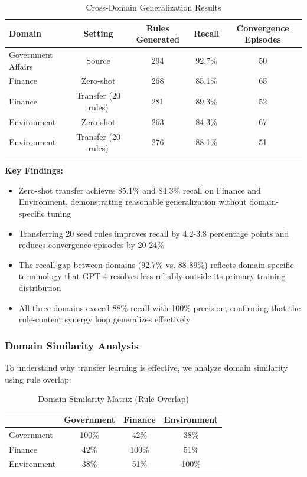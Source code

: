 \documentclass[runningheads]{llncs}
\begin{document}
\begin{table}[H]
    \centering
    \caption{Cross-Domain Generalization Results}
    \label{tab:cross_domain}
    \begin{tabular}{l c c c c}
    \toprule
    Domain & Setting & Rules Generated & Recall & Convergence Episodes \\
    \midrule
    Government Affairs & Source & 294 & 92.7\% & 50 \\
    \midrule
    Finance & Zero-shot & 268 & 85.1\% & 65 \\
    Finance & Transfer (20 rules) & 281 & 89.3\% & 52 \\
    \midrule
    Environment & Zero-shot & 263 & 84.3\% & 67 \\
    Environment & Transfer (20 rules) & 276 & 88.1\% & 51 \\
    \bottomrule
    \end{tabular}
\end{table}

\textbf{Key Findings:}
\begin{itemize}
    \item Zero-shot transfer achieves 85.1\% and 84.3\% recall on Finance and Environment, demonstrating reasonable generalization without domain-specific tuning
    \item Transferring 20 seed rules improves recall by 4.2-3.8 percentage points and reduces convergence episodes by 20-24\%
    \item The recall gap between domains (92.7\% vs. 88-89\%) reflects domain-specific terminology that GPT-4 resolves less reliably outside its primary training distribution
    \item All three domains exceed 88\% recall with 100\% precision, confirming that the rule-content synergy loop generalizes effectively
\end{itemize}

\subsubsection{Domain Similarity Analysis}

To understand why transfer learning is effective, we analyze domain similarity using rule overlap:

\begin{table}[H]
    \centering
    \caption{Domain Similarity Matrix (Rule Overlap)}
    \label{tab:domain_similarity}
    \begin{tabular}{l c c c}
    \toprule
    & Government & Finance & Environment \\
    \midrule
    Government & 100\% & 42\% & 38\% \\
    Finance & 42\% & 100\% & 51\% \\
    Environment & 38\% & 51\% & 100\% \\
    \bottomrule
    \end{tabular}
\end{table}
\end{document}
